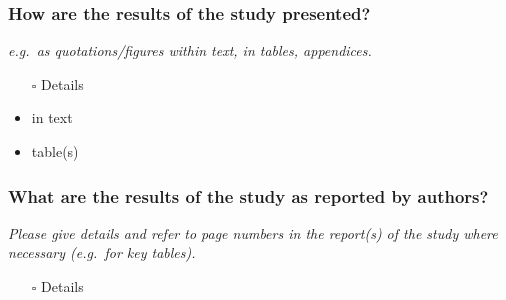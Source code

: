 \documentclass[
  doc, a4paper]{apa7}
\providecommand{\tightlist}{%
  \setlength{\itemsep}{0pt}\setlength{\parskip}{0pt}}
\begin{document}
\subsubsection{How are the results of the study presented?}\label{how-are-the-results-of-the-study-presented}

\emph{e.g.~as quotations/figures within text, in tables, appendices.}

\begin{itemize}
\item[$\square$]
  Details
\item
  in text
\item
  table(s)
\end{itemize}

\subsubsection{What are the results of the study as reported by authors?}\label{what-are-the-results-of-the-study-as-reported-by-authors}

\emph{Please give details and refer to page numbers in the report(s) of the study where necessary (e.g.~for key tables).}

\begin{itemize}
\tightlist
\item[$\square$]
  Details
\end{itemize}
\end{document}
